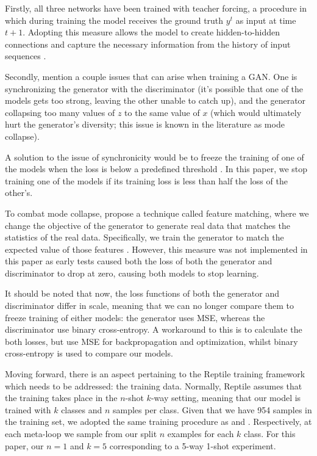 \documentclass[a4paper]{book}
\begin{document}
Firstly, all three networks have been trained with teacher forcing, a procedure in which during training the model receives the ground truth $y^t$ as input at time $t+1$. Adopting this measure allows the model to create hidden-to-hidden connections and capture the necessary information from the history of input sequences \parencite{goodfellow_deep_2016}.

Secondly, \textcite{goodfellow_generative_2014} mention a couple issues that can arise when training a GAN. One is synchronizing the generator with the discriminator (it's possible that one of the models gets too strong, leaving the other unable to catch up), and the generator collapsing too many values of $z$ to the same value of $x$ (which would ultimately hurt the generator's diversity; this issue is known in the literature as mode collapse).

A solution to the issue of synchronicity would be to freeze the training of one of the models when the loss is below a predefined threshold \parencite{mogren_c-rnn-gan_2016}. In this paper, we stop training one of the models if its training loss is less than half the loss of the other's.

To combat mode collapse, \textcite{salimans_improved_2016} propose a technique called feature matching, where we change the objective of the generator to generate real data that matches the statistics of the real data. Specifically, we train the generator to match the expected value of those features \parencite{salimans_improved_2016}. However, this measure was not implemented in this paper as early tests caused both the loss of both the generator and discriminator to drop at zero, causing both models to stop learning.

It should be noted that now, the loss functions of both the generator and discriminator differ in scale, meaning that we can no longer compare them to freeze training of either models: the generator uses MSE, whereas the discriminator use binary cross-entropy. A workaround to this is to calculate the both losses, but use MSE for backpropagation and optimization, whilst binary cross-entropy is used to compare our models.

Moving forward, there is an aspect pertaining to the Reptile training framework which needs to be addressed: the training data. Normally, Reptile assumes that the training takes place in the $n$-shot $k$-way setting, meaning that our model is trained with $k$ classes and $n$ samples per class. Given that we have 954 samples in the training set, we adopted the same training procedure as \textcite{nichol_first-order_2018} and \textcite{clouatre_figr_2019}. Respectively, at each meta-loop we sample from our split $n$ examples for each $k$ class. For this paper, our $n=1$ and $k=5$ corresponding to a 5-way 1-shot experiment.
\end{document}
